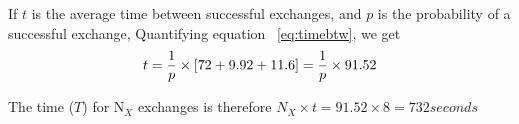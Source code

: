 \documentclass{rspublic}
\newcommand{\alnote}[1]{ {\textcolor{blue} { ***andre: #1 }}}
\newcommand{\alnote}[1]{}
\begin{document}
If $t$ is the average time between successful exchanges, and $p$ is the probability of a successful exchange, 
Quantifying equation ~\ref{eq:timebtw}, we get
\begin{eqnarray}
t=  {1 \over p} \times {[72 + 9.92 + 11.6]} = {1 \over p} \times 91.52
\label{eq:timebt}
\end{eqnarray}

The time ($T$) for N$_{X}$ exchanges is therefore $N_{X} \times t = 91.52 \times 8 = 732 seconds$



\end{document}
